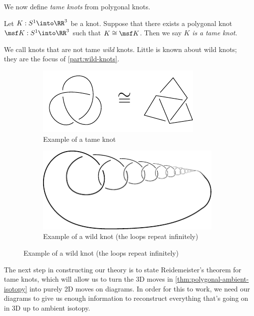 We now define \emph{tame knots} from polygonal knots.
\begin{definition}
  Let $K : S^1 \into \RR^3$ be a knot. Suppose that there exists a
  polygonal knot $\msf K : S^1 \into \RR^3$ such that $K \cong \msf
  K$. Then we say \emph{$K$ is a tame knot}.
\end{definition}
We call knots that are not tame \emph{wild} knots. Little is known
about wild knots; they are the focus of \cref{part:wild-knots}.
\begin{figure}[H]
  \begin{minipage}{.49\linewidth}
    \begin{figure}[H]
      \centering
      \includegraphics{figures/background/polygonal-knot.pdf}
      \caption{Example of a tame knot}
    \end{figure}
  \end{minipage}
  \begin{minipage}{.49\linewidth}
    \vspace{1.25em}
    \begin{figure}[H]
      \centering
      \includegraphics[scale=.6]{figures/background/wild-knot-example.pdf}
      \caption{Example of a wild knot (the loops repeat infinitely)}
    \end{figure}
  \end{minipage}
\end{figure}
The next step in constructing our theory is to state Reidemeister's
theorem for tame knots, which will allow us to turn the 3D moves in
\cref{thm:polygonal-ambient-isotopy} into purely 2D moves on diagrams.
In order for this to work, we need our diagrams to give us enough
information to reconstruct everything that's going on in $3$D up to
ambient isotopy.


